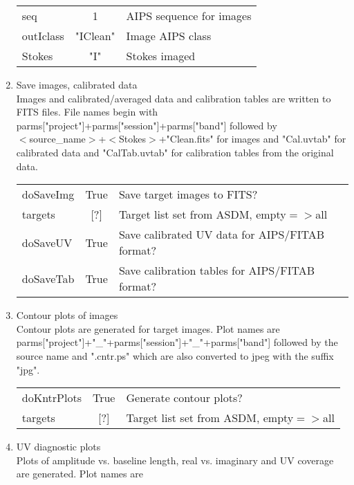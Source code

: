 \documentclass[11pt]{article}
\begin{document}
\begin{enumerate}
\begin{center}
\begin{tabular}{|l|c|l|}
seq         & 1        & AIPS sequence for images \\
outIclass   & "IClean" & Image AIPS class\\
Stokes      & "I"      & Stokes imaged \\
\hline
\end{tabular}
\end{center}
%
\item Save images, calibrated data\\
Images and calibrated/averaged data and calibration tables are written
to FITS files.
File names begin with \\
parms["project"]+parms["session"]+parms["band"]
followed by \\
$<$source\_name$>$+$<$Stokes$>$+"Clean.fits" for images and
"Cal.uvtab" for calibrated data and "CalTab.uvtab" for calibration
tables from the original data.
\begin{center}
\begin{tabular}{|l|c|l|}
\hline
doSaveImg & True &  Save target images to FITS?\\
targets   & [?]  & Target list set from ASDM, empty$=>$all\\
doSaveUV  & True & Save calibrated UV data for AIPS/FITAB format? \\
doSaveTab & True &  Save calibration tables for AIPS/FITAB format?\\
\hline
\end{tabular}
\end{center}
%
\item Contour plots of images\\
Contour plots are generated for target images.
Plot names are \\
parms["project"]+"\_"+parms["session"]+"\_"+parms["band"]
followed by the source name and ".cntr.ps" which are also converted
to jpeg with the suffix "jpg".
\begin{center}
\begin{tabular}{|l|c|l|}
\hline
doKntrPlots & True &  Generate contour plots?\\
targets   & [?]  & Target list set from ASDM, empty$=>$all\\
\hline
\end{tabular}
\end{center}
%
\item UV diagnostic plots\\
Plots of amplitude vs. baseline length, real vs. imaginary and UV
coverage are generated.
Plot names are \\

\end{enumerate}
\end{document}
